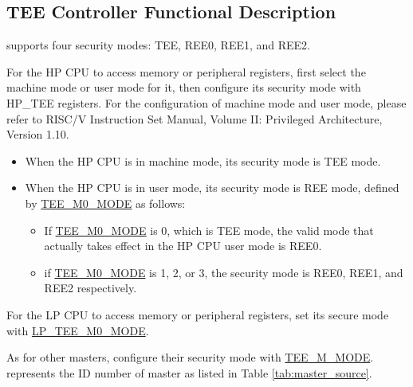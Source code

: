 \documentclass[main\_\_EN.tex]{subfiles}
\begin{document}
\subsection{TEE Controller Functional Description}

\chipname{} supports four security modes: TEE, REE0, REE1, and REE2.

For the HP CPU to access memory or peripheral registers, first select the machine mode or user mode for it, then configure its security mode with HP\_TEE registers. For the configuration of machine mode and user mode, please refer to RISC\-/V Instruction Set Manual, Volume II: Privileged Architecture, Version 1.10.

\begin{itemize}
    \item When the HP CPU is in machine mode, its security mode is TEE mode.
    \item When the HP CPU is in user mode, its security mode is REE mode, defined by \hyperref[fielddesc:TEEMNMODE]{TEE\_M0\_MODE} as follows:
    \begin{itemize}
        \item If \hyperref[fielddesc:TEEMNMODE]{TEE\_M0\_MODE} is 0, which is TEE mode, the valid mode that actually takes effect in the HP CPU user mode is REE0.
        \item if \hyperref[fielddesc:TEEMNMODE]{TEE\_M0\_MODE} is 1, 2, or 3, the security mode is REE0, REE1, and REE2 respectively.
    \end{itemize}
\end{itemize}

For the LP CPU to access memory or peripheral registers, set its secure mode with \hyperref[fielddesc:LPTEEM0MODE]{LP\_TEE\_M0\_MODE}.

As for other masters, configure their security mode with \hyperref[fielddesc:TEEMNMODE]{TEE\_M\_MODE}.  represents the ID number of master as listed in Table \ref{tab:master_source}.
\end{document}
